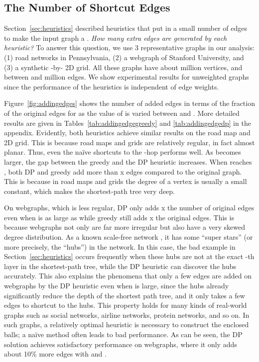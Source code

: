 \subsection{The Number of Shortcut Edges}

Section~\ref{sec:heuristics} described heuristics that put in a small number of
edges to make the input graph a .  \emph{How many extra edges
  are generated by each heuristic?}  To answer this question, we use 3
representative graphs in our analysis: (1) road networks in Pennsylvania, (2) a
webgraph of Stanford University, and (3) a synthetic -by- 2D grid.
All these graphs have about  million vertices, and between  and 
million edges.  We show experimental results for unweighted graphs since the
performance of the heuristics is independent of edge weights.



Figure~\ref{fig:addingedges} shows the number of added edges in terms of the
fraction of the original edges for  as the value of  is varied
between  and .  More detailed results are given in
Tables~\ref{tab:addingedgegreedy} and \ref{tab:addingedgedp} in the appendix.
Evidently, both heuristics achieve similar results on the road map and 2D
grid. This is because road maps and grids are relatively regular, in fact
almost planar.  Thus, even the na\"ive shortcuts to the -hop performs
well. As  becomes larger, the gap between the greedy and the DP heuristic
increases.  When  reaches , both DP and greedy add more than x
edges compared to the original graph. This is because in road maps and grids the
degree of a vertex is usually a small constant, which makes the shortest-path tree very
deep.

On webgraphs, which is less regular, DP only adds x the number of original
edges even when  is as large as  while greedy still adds x the
original edges. This is because webgraphs not only are far more irregular but
also have a very skewed degree distribution.  As a known scale-free network
\cite{barabasi1999emergence}, it has some ``super stars'' (or more precisely,
the ``hubs'') in the network.  In this case, the bad example in
Section~\ref{sec:heuristics} occurs frequently when these hubs are not at the
exact -th layer in the shortest-path tree, while the DP heuristic can
discover the hubs accurately.  This also explains the phenomena that only a few
edges are added on webgraphs by the DP heuristic even when  is large,
since the hubs already significantly reduce the depth of the shortest path tree,
and it only takes a few edges to shortcut to the hubs.  This property holds for
many kinds of real-world graphs such as social networks, airline networks,
protein networks, and so on.  In such graphs, a relatively optimal heuristic is
necessary to construct the enclosed balls; a na\"ive method often leads to bad
performance.  As can be seen, the DP solution achieves satisfactory performance
on webgraphs, where it only adds about 10\% more edges with  and
.


